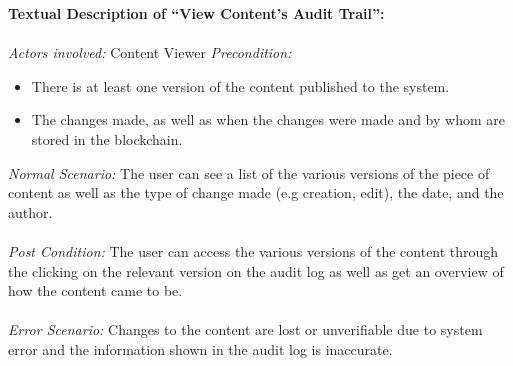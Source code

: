 \newpage
\noindent
\textbf{Textual Description of “View Content's Audit Trail”:} \\ \\
\textit{Actors involved:} Content Viewer
\textit{Precondition:} 
	\begin{itemize}
		\item There is at least one version of the content published to the system.
		\item The changes made, as well as when the changes were made and by whom are stored in the blockchain.
	\end{itemize}
\textit{Normal Scenario:} The user can see a list of the various versions of the 
						  piece of content as well as the type of change made 
						  (e.g creation, edit), the date, and the author. \\ \\
\textit{Post Condition:} The user can access the various versions of the content through 
						 the clicking on the relevant version on the audit log as well as 
						 get an overview of how the content came to be. \\ \\
\textit{Error Scenario:} Changes to the content are lost or unverifiable due to system error 
						 and the information shown in the audit log is inaccurate. \\ \\
